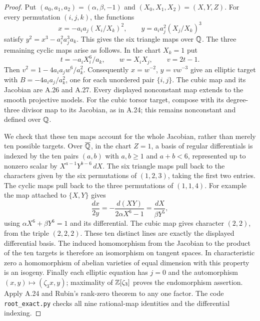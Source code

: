 \begin{proof}
Put $(a_0,a_1,a_2)=(\alpha,\beta,-1)$ and
$(X_0,X_1,X_2)=(X,Y,Z)$. For every permutation $(i,j,k)$, the functions
\[
x=-a_i a_j(X_i/X_k)^2,\qquad
y=a_i a_j^2(X_j/X_k)^3
\]
satisfy $y^2=x^3-a_i^2a_j^3a_k$. This gives the six triangle maps
over $\mathbb Q$. The three remaining cyclic maps arise as follows. In the
chart $X_k=1$ put
\[
t=-a_iX_i^6/a_k,\qquad w=X_iX_j,\qquad v=2t-1.
\]
Then $v^2=1-4a_i a_jw^6/a_k^2$. Consequently
$x=w^{-2}$, $y=vw^{-3}$ give an elliptic target with
$B=-4a_i a_j/a_k^2$, one for each unordered pair $\{i,j\}$.
The cubic map and its Jacobian are A.26 and A.27. Every displayed
nonconstant map extends to the smooth projective models. For the
cubic torsor target, compose with its degree-three divisor map to its
Jacobian, as in A.24; this remains nonconstant and defined over $\mathbb Q$.

We check that these ten maps account for the whole Jacobian, rather
than merely ten possible targets. Over $\overline{\mathbb Q}$, in the chart
$Z=1$, a basis of regular differentials is indexed by the ten pairs
$(a,b)$ with $a,b\ge1$ and $a+b<6$, represented up to nonzero scalar by
$X^{a-1}Y^{b-6}\,dX$. The six triangle maps pull back to the characters
given by the six permutations of $(1,2,3)$, taking the first two
entries. The cyclic maps pull back to the three permutations of
$(1,1,4)$. For example the map attached to $\{X,Y\}$ gives
\[
\frac{dx}{2y}
=-\frac{d(XY)}{2\alpha X^6-1}
=\frac{dX}{\beta Y^5},
\]
using $\alpha X^6+\beta Y^6=1$ and its differential.
The cubic map gives character $(2,2)$, from the triple $(2,2,2)$.
These ten distinct lines are exactly the displayed differential basis.
The induced homomorphism from the Jacobian to the product of the ten
targets is therefore an isomorphism on tangent spaces. In characteristic
zero a homomorphism of abelian varieties of equal dimension with this
property is an isogeny. Finally each elliptic equation has $j=0$ and the
automorphism $(x,y)\mapsto(\zeta_3x,y)$; maximality of
$\mathbb Z[\zeta_3]$ proves the endomorphism assertion. Apply A.24 and Rubin's
rank-zero theorem to any one factor. The code \texttt{root\_exact.py}
checks all nine rational-map identities and the differential indexing.
\end{proof}

